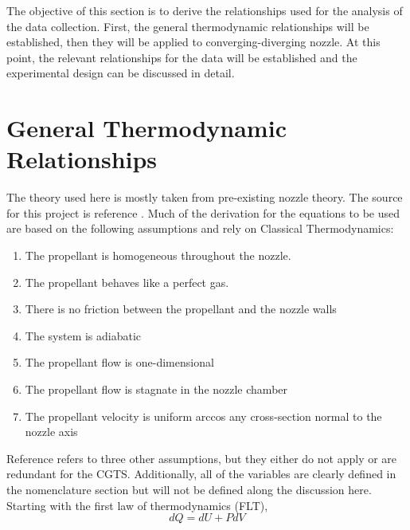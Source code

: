 The objective of this section is to derive the relationships used for the analysis of the data collection. First, the general thermodynamic relationships will be established, then they will be applied to converging-diverging nozzle. At this point, the relevant relationships for the data will be established and the experimental design can be discussed in detail.
\section{General Thermodynamic Relationships}
The theory used here is mostly taken from pre-existing nozzle theory. The source for this project is reference \cite{langton}. Much of the derivation for the equations to be used are based on the following assumptions and rely on Classical Thermodynamics:
\begin{enumerate}
\item The propellant is homogeneous throughout the nozzle.
\item The propellant behaves like a perfect gas.
\item There is no friction between the propellant and the nozzle walls
\item The system is adiabatic
\item The propellant flow is one-dimensional
\item The propellant flow is stagnate in the nozzle chamber
\item The propellant velocity is uniform arccos any cross-section normal to the nozzle axis
\end{enumerate}
Reference \cite{langton} refers to three other assumptions, but they either do not apply or are redundant for the CGTS. Additionally, all of the variables are clearly defined in the nomenclature section but will not be defined along the discussion here.\\
Starting with the first law of thermodynamics (FLT),
\begin{equation}\label{eq:FLT}
dQ=dU+PdV
\end{equation}%
%
%
%
%
%
%
%
%
